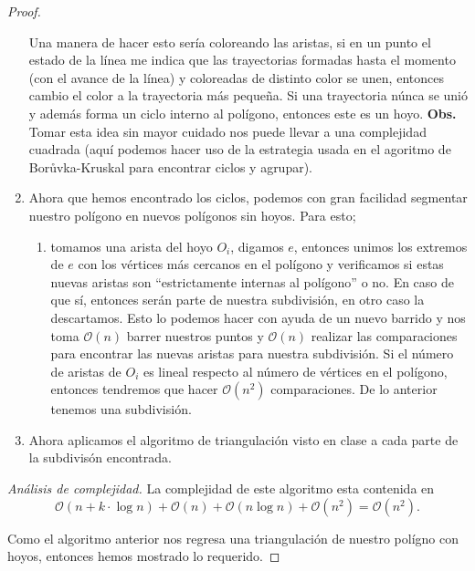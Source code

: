 \begin{proof}
\begin{enumerate}
    Una manera de hacer esto sería coloreando las aristas, si en un punto el estado
    de la línea me indica que las trayectorias formadas hasta el momento (con el
    avance de la línea) y coloreadas de distinto color se unen, entonces cambio el
    color a la trayectoria más pequeña. Si una trayectoria núnca se unió y además
    forma un ciclo interno al polígono, entonces este es un hoyo. \textbf{Obs.} Tomar
    esta idea sin mayor cuidado nos puede llevar a una complejidad cuadrada (aquí
    podemos hacer uso de la estrategia usada en el agoritmo de  Borůvka-Kruskal
    para encontrar ciclos y agrupar).
  \item Ahora que hemos encontrado los ciclos, podemos con gran facilidad segmentar
    nuestro polígono en nuevos polígonos sin hoyos. Para esto;
    \begin{enumerate}
    \item tomamos una arista del hoyo $O_i$, digamos $e$, entonces unimos los extremos
      de $e$ con los vértices más cercanos en el polígono y verificamos si estas nuevas
      aristas son ``estrictamente internas al polígono'' o no. En caso de que sí, entonces
      serán parte de nuestra subdivisión, en otro caso la descartamos. Esto lo podemos
      hacer con ayuda de un nuevo barrido y nos toma $\mathcal{O}(n)$ barrer nuestros puntos
      y $\mathcal{O}(n)$ realizar las comparaciones para encontrar las nuevas aristas para
      nuestra subdivisión. Si el número de aristas de $O_i$ es lineal respecto al número de vértices
      en el polígono, entonces tendremos que hacer $\mathcal{O}(n^2)$ comparaciones. De lo
      anterior tenemos una subdivisión.
    \end{enumerate}
  \item Ahora aplicamos el algoritmo de triangulación visto en clase a cada parte de la subdivisón
    encontrada.
  \end{enumerate}
  \textit{Análisis de complejidad.} La complejidad de este algoritmo esta contenida en
  \[\mathcal{O}(n + k\cdot \log n) + \mathcal{O}(n) + \mathcal{O}(n \log n) + \mathcal{O}(n^2) = \mathcal{O}(n^2).\]
  
  Como el algoritmo anterior nos regresa una triangulación de nuestro polígno con hoyos, entonces
  hemos mostrado lo requerido.
\end{proof}
